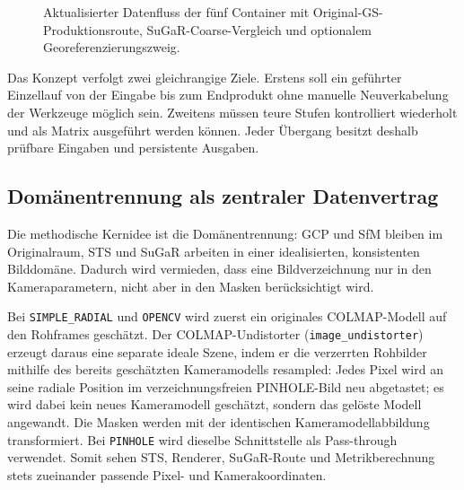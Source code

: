 \begin{figure}[H]
{%
}
\caption{Aktualisierter Datenfluss der fünf Container mit Original-GS-
Produktionsroute, SuGaR-Coarse-Vergleich und optionalem
Georeferenzierungszweig.}
\label{fig:pa-pipeline-flow}
\end{figure}

Das Konzept verfolgt zwei gleichrangige Ziele. Erstens soll ein geführter
Einzellauf von der Eingabe bis zum Endprodukt ohne manuelle Neuverkabelung der
Werkzeuge möglich sein. Zweitens müssen teure Stufen kontrolliert wiederholt
und als Matrix ausgeführt werden können. Jeder Übergang besitzt deshalb
prüfbare Eingaben und persistente Ausgaben.

\subsection{Domänentrennung als zentraler Datenvertrag}

Die methodische Kernidee ist die Domänentrennung: GCP und SfM bleiben im
Originalraum, STS und SuGaR arbeiten in einer idealisierten, konsistenten
Bilddomäne. Dadurch wird vermieden, dass eine Bildverzeichnung nur in den
Kameraparametern, nicht aber in den Masken berücksichtigt wird.

Bei \texttt{SIMPLE\_RADIAL} und \texttt{OPENCV} wird zuerst ein originales
COLMAP-Modell auf den Rohframes geschätzt. Der COLMAP-Undistorter
(\texttt{image\_undistorter}) erzeugt daraus eine separate ideale Szene, indem
er die verzerrten Rohbilder mithilfe des bereits geschätzten Kameramodells
resampled: Jedes Pixel wird an seine radiale Position im verzeichnungsfreien
PINHOLE-Bild neu abgetastet; es wird dabei kein neues Kameramodell geschätzt,
sondern das gelöste Modell angewandt. Die Masken werden mit der identischen
Kameramodellabbildung transformiert. Bei \texttt{PINHOLE} wird dieselbe
Schnittstelle als Pass-through verwendet. Somit sehen STS, Renderer,
SuGaR-Route und Metrikberechnung stets zueinander passende Pixel- und
Kamerakoordinaten.


